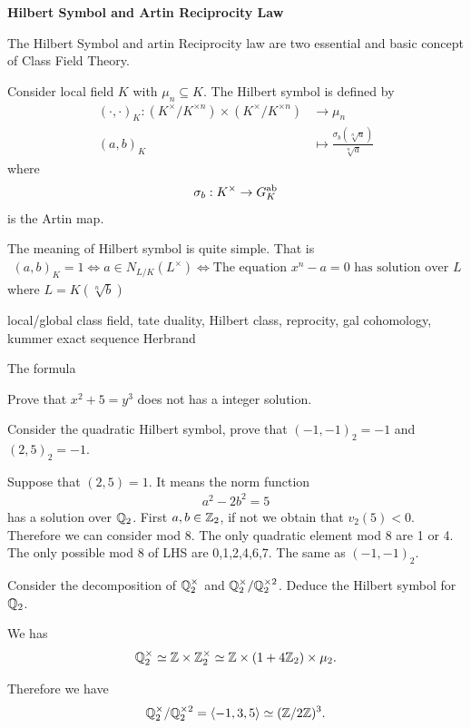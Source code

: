 {\textbf{Hilbert Symbol and Artin Reciprocity Law}

The Hilbert Symbol and artin Reciprocity law are two essential and basic concept of Class Field Theory.




Consider local field $K$ with $\mu_n\subseteq K$. The Hilbert symbol is defined by 
\begin{align*}
    (\cdot,\cdot)_K: (K^\times/K^{\times n}) \times (K^\times/K^{\times n}) &\to \mu_n\\
    (a,b)_K &\mapsto \frac{\sigma_b(\sqrt[n]{a})}{\sqrt[n]{a}}
\end{align*}
where 
\begin{align*}
    \sigma_b:K^\times \to G_K^{\text{ab}}
\end{align*}
is the Artin map. 




The meaning of Hilbert symbol is quite simple. That is 
\begin{align*}
    (a,b)_K=1\Longleftrightarrow a\in N_{L/K}(L^\times)\Longleftrightarrow  \text{The equation }x^n-a=0\text{ has solution over }L
\end{align*}
where $L=K(\sqrt[n]{b})$


local/global class field, tate duality, Hilbert class, reprocity, gal cohomology, kummer exact sequence
Herbrand

The formula 

\prob Prove that $x^2+5=y^3$ does not has a integer solution.

\prob Consider the quadratic Hilbert symbol, prove that $(-1,-1)_2 = -1$ and $(2,5)_2 = -1$.

Suppose that $(2,5)=1$. It means the norm function 
\begin{align*}
    a^2-2b^2= 5
\end{align*}
has a solution over $\mathbb{Q}_2$. First $a,b\in \mathbb{Z}_2$, if not we obtain that $v_2(5)<0$. 
Therefore we can consider mod 8. The only quadratic element mod 8 are 1 or 4. The only possible mod 8 of LHS are 0,1,2,4,6,7. 
The same as $(-1,-1)_2$.


\prob Consider the decomposition of $\mathbb{Q}_2^\times$ and $\mathbb{Q}_2^\times/\mathbb{Q}_2^{\times 2}$. Deduce the Hilbert symbol for $\mathbb{Q}_2$.

We has 
\begin{align*}
    \mathbb{Q}_2^\times\simeq \mathbb{Z}\times \mathbb{Z}_2^\times \simeq \mathbb{Z}\times (1+4\mathbb{Z}_2)\times \mu_2.
\end{align*}

Therefore we have 
\begin{align*}
    \mathbb{Q}_2^\times/\mathbb{Q}_2^{\times 2} = \langle -1,3,5 \rangle \simeq (\mathbb{Z}/2\mathbb{Z})^3.
\end{align*}


}
